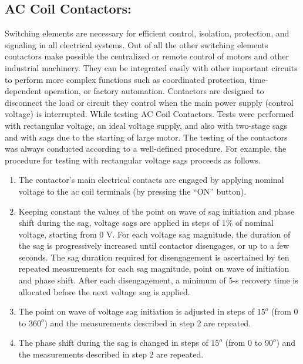 \documentclass[14pt, a4paper]{extreport}
\begin{document}
 \subsection{AC Coil Contactors:} Switching elements are necessary for efficient control, isolation, protection, and signaling in all electrical systems. Out of all the other switching elements contactors make possible the centralized or remote control of motors and other industrial machinery. They can be integrated easily with other important circuits to perform more complex functions such as coordinated protection, time-dependent operation, or factory automation. Contactors are designed to disconnect the load or circuit they control when the main power supply (control voltage) is interrupted. While testing AC Coil Contactors. Tests were performed with rectangular voltage, an ideal voltage supply, and also with two-stage sags and with sags due to the starting of large motor. The testing of the contactors was always conducted according to a well-defined procedure. For example, the procedure for testing with rectangular voltage sags proceeds as follows.
 \begin{enumerate}
     \item The contactor’s main electrical contacts are engaged by applying nominal voltage to the ac coil terminals (by pressing
the “ON” button).
\item Keeping constant the values of the point on wave of sag initiation and phase shift during the sag, voltage sags are applied in steps of 1\% of nominal voltage, starting from 0 V. For each voltage sag magnitude, the duration of the sag is progressively increased until contactor disengages, or up to a few seconds. The sag duration required for disengagement is ascertained by ten repeated measurements for each sag magnitude, point on wave of initiation and phase shift. After each disengagement, a minimum of 5-s recovery time is allocated before the next voltage sag is applied. 
\item The point on wave of voltage sag initiation is adjusted in steps of $15^{o}$ (from 0 to $360^{o}$) and the measurements described
in step 2 are repeated.
\item The phase shift during the sag is changed in steps of $15^{o}$ (from 0 to $90^{o}$) and the measurements described in step 2 are
repeated. 
\end{enumerate}
\end{document}
